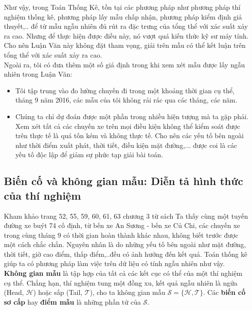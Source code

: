 \documentclass[a4paper, 13pt]{report}
\begin{document}
Như vậy, trong Toán Thống Kê, tồn tại các phương pháp như phương pháp thí nghiệm thống kê, phương pháp lấy mẫu chấp nhận, phương pháp kiểm định giả thuyết,.. để từ mẫu ngẫu nhiên đủ rút ra đặc trưng của tổng thể với xác suất xảy ra cao. Nhưng để thực hiện được điều này, nó vượt quá kiến thức kỹ sư máy tính. Cho nên Luận Văn này không đặt tham vọng, giải trên mẫu có thể kết luận trên tổng thể với xác suất xảy ra cao.\\
Ngoài ra, tôi có đưa thêm một số giả định trong khi xem xét mẫu được lấy ngẫu nhiên trong Luận Văn: 
\begin{itemize}
\item Tôi tập trung vào đo lường chuyến đi trong một khoảng thời gian cụ thể, tháng 9 năm 2016, các mẫu của tôi không rải rác qua các tháng, các năm. 
\item  Chúng ta chỉ dự đoán được một phần trong nhiều hiện tượng mà ta gặp phải. Xem xét tất cả các chuyến xe trên mọi điều kiện không thể kiểm soát được trên thực tế là quá tốn kém và không thực tế. Cho nên các yếu tố bên ngoài như thời điểm xuất phát, thời tiết, điều kiện mặt đường,... được coi là các yếu tố độc lập để giảm sự phức tạp giải bài toán.
\end{itemize}  
\subsection*{Biến cố và không gian mẫu: Diễn tả hình thức của thí nghiệm}
Kham khảo trang 52, 55, 59, 60, 61, 63 chương 3 từ sách \cite{TKCNUDR}
Ta thấy cùng một tuyến đường xe buýt 74 cố định, từ bến xe An Sương - bến xe Củ Chi, các chuyến xe trong cùng tháng 9 có thời gian hoàn thành khác nhau, không biết trước được một cách chắc chắn. Nguyên nhân là do những yếu tố bên ngoài như mặt đường, thời tiết, giờ cao điểm, thấp điểm,..đều có ảnh hưởng đến kết quả. Toán thống kê giúp ta có phương pháp làm việc trên dữ liệu có tính ngẫu nhiên như vậy.\\
\textbf{Không gian mẫu} là tập hợp của tất cả các kết cục có thể của một thí nghiệm cụ thể. Chẳng hạn, thí nghiệm tung một đồng xu, kết quả ngẫu nhiên là ngửa (Head, $\mathcal{H}$) hoặc sấp (Tail, $\mathcal{T}$), cho ta không gian mẫu $\mathcal{S= \{H,T}\}$. Các \textbf{biến cố sơ cấp} hay \textbf{điểm mẫu} là những phần tử của $\mathcal{S}$.\\
\end{document}
